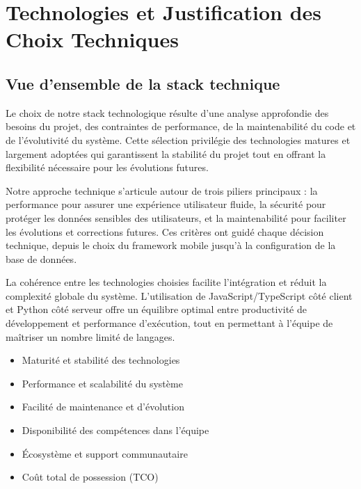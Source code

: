 \section{Technologies et Justification des Choix Techniques}

\subsection{Vue d'ensemble de la stack technique}

Le choix de notre stack technologique résulte d'une analyse approfondie des besoins du projet, des contraintes de performance, de la maintenabilité du code et de l'évolutivité du système. Cette sélection privilégie des technologies matures et largement adoptées qui garantissent la stabilité du projet tout en offrant la flexibilité nécessaire pour les évolutions futures.

Notre approche technique s'articule autour de trois piliers principaux : la performance pour assurer une expérience utilisateur fluide, la sécurité pour protéger les données sensibles des utilisateurs, et la maintenabilité pour faciliter les évolutions et corrections futures. Ces critères ont guidé chaque décision technique, depuis le choix du framework mobile jusqu'à la configuration de la base de données.

La cohérence entre les technologies choisies facilite l'intégration et réduit la complexité globale du système. L'utilisation de JavaScript/TypeScript côté client et Python côté serveur offre un équilibre optimal entre productivité de développement et performance d'exécution, tout en permettant à l'équipe de maîtriser un nombre limité de langages.

\begin{infobox}
\begin{itemize}[leftmargin=1cm]
\item Maturité et stabilité des technologies
\item Performance et scalabilité du système
\item Facilité de maintenance et d'évolution
\item Disponibilité des compétences dans l'équipe
\item Écosystème et support communautaire
\item Coût total de possession (TCO)
\end{itemize}
\end{infobox}

